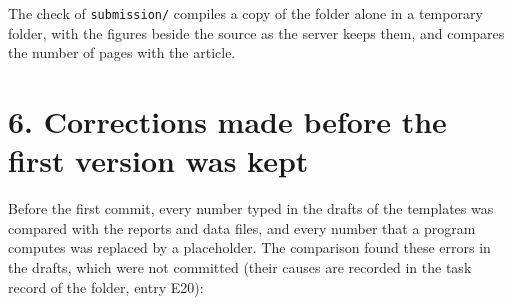 \documentclass[
  10pt,
]{article}
\begin{document}
The check of \texttt{submission/} compiles a copy of the folder alone in
a temporary folder, with the figures beside the source as the server
keeps them, and compares the number of pages with the article.

\hypertarget{corrections-made-before-the-first-version-was-kept}{%
\section{6. Corrections made before the first version was
kept}\label{corrections-made-before-the-first-version-was-kept}}

Before the first commit, every number typed in the drafts of the
templates was compared with the reports and data files, and every number
that a program computes was replaced by a placeholder. The comparison
found these errors in the drafts, which were not committed (their causes
are recorded in the task record of the folder, entry E20):
\end{document}
